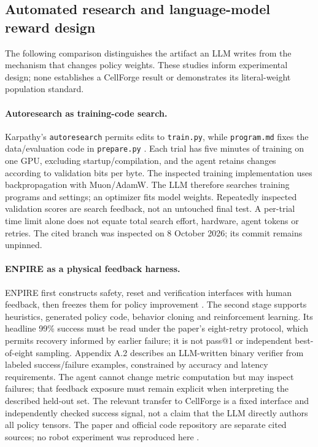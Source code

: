 \documentclass[11pt]{article}
\begin{document}
\subsection{Automated research and language-model reward design}\label{sec:rewardrelated}
The following comparison distinguishes the artifact an LLM writes from the mechanism
that changes policy weights. These studies inform experimental design; none establishes
a CellForge result or demonstrates its literal-weight population standard.

\paragraph{Autoresearch as training-code search.}
Karpathy's \texttt{autoresearch} permits edits to \texttt{train.py}, while
\texttt{program.md} fixes the data/evaluation code in \texttt{prepare.py}
\cite{autoresearchcode}. Each trial has five minutes of training on one GPU,
excluding startup/compilation, and the agent retains changes according to validation
bits per byte. The inspected training implementation uses backpropagation with
Muon/AdamW. The LLM therefore searches training programs and settings; an optimizer
fits model weights. Repeatedly inspected validation scores are search feedback,
not an untouched final test. A per-trial time limit alone does not equate total
search effort, hardware, agent tokens or retries. The cited branch was inspected
on 8 October 2026; its commit remains unpinned.

\paragraph{ENPIRE as a physical feedback harness.}
ENPIRE first constructs safety, reset and verification interfaces with human feedback,
then freezes them for policy improvement \cite{enpire2026}. The second stage supports
heuristics, generated policy code, behavior cloning and reinforcement learning.
Its headline 99\% success must be read under the paper's eight-retry protocol,
which permits recovery informed by earlier failure; it is not pass@1 or independent
best-of-eight sampling. Appendix A.2 describes an LLM-written binary verifier from
labeled success/failure examples, constrained by accuracy and latency requirements.
The agent cannot change metric computation but may inspect failures; that feedback
exposure must remain explicit when interpreting the described held-out set.
The relevant transfer to CellForge is a fixed interface and independently checked
success signal, not a claim that the LLM directly authors all policy tensors.
The paper and official code repository are separate cited sources; no robot
experiment was reproduced here \cite{enpirerepo}.
\end{document}
